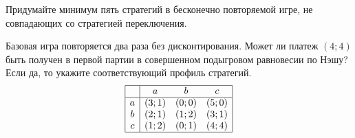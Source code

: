 \begin{problem}

Придумайте минимум пять стратегий в бесконечно повторяемой игре, не совпадающих со стратегией переключения.



\begin{sol}

\end{sol}
\end{problem}



\begin{problem}
 [LSE, 1996]

Базовая игра повторяется два раза без дисконтирования. Может ли платеж  $\left(4;4\right)$  быть получен в первой партии в совершенном подыгровом равновесии по Нэшу? Если да, то укажите соответствующий профиль стратегий.
\[\begin{array}{|c|ccc|}  \hline {} & {a} & {b} & {c} \\  \hline {a} & {\left(3;1\right)} & {\left(0;0\right)} & {\left(5;0\right)} \\ {b} & {\left(2;1\right)} & {\left(1;2\right)} & {\left(3;1\right)} \\ {c} & {\left(1;2\right)} & {\left(0;1\right)} & {\left(4;4\right)} \\  \hline  \end{array}\]



\begin{sol}

\end{sol}
\end{problem}



